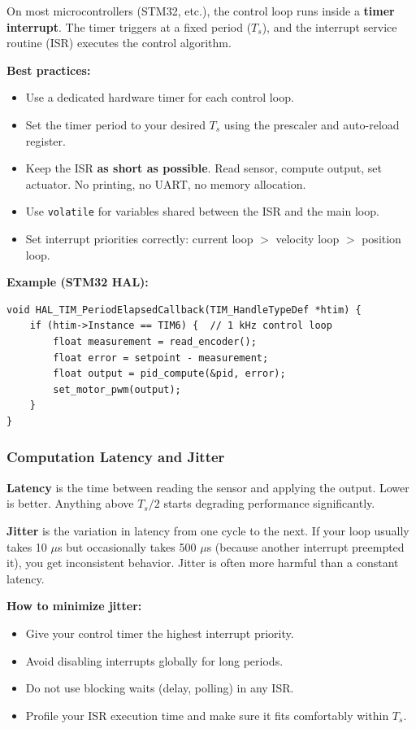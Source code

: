 On most microcontrollers (STM32, etc.), the control loop runs inside a \textbf{timer interrupt}. The timer triggers at a fixed period ($T_s$), and the interrupt service routine (ISR) executes the control algorithm.

\textbf{Best practices:}
\begin{itemize}
    \item Use a dedicated hardware timer for each control loop.
    \item Set the timer period to your desired $T_s$ using the prescaler and auto-reload register.
    \item Keep the ISR \textbf{as short as possible}. Read sensor, compute output, set actuator. No printing, no UART, no memory allocation.
    \item Use \texttt{volatile} for variables shared between the ISR and the main loop.
    \item Set interrupt priorities correctly: current loop $>$ velocity loop $>$ position loop.
\end{itemize}

\textbf{Example (STM32 HAL):}
\begin{verbatim}
void HAL_TIM_PeriodElapsedCallback(TIM_HandleTypeDef *htim) {
    if (htim->Instance == TIM6) {  // 1 kHz control loop
        float measurement = read_encoder();
        float error = setpoint - measurement;
        float output = pid_compute(&pid, error);
        set_motor_pwm(output);
    }
}
\end{verbatim}

\subsubsection{Computation Latency and Jitter}

\textbf{Latency} is the time between reading the sensor and applying the output. Lower is better. Anything above $T_s / 2$ starts degrading performance significantly.

\textbf{Jitter} is the variation in latency from one cycle to the next. If your loop usually takes 10 $\mu$s but occasionally takes 500 $\mu$s (because another interrupt preempted it), you get inconsistent behavior. Jitter is often more harmful than a constant latency.

\textbf{How to minimize jitter:}
\begin{itemize}
    \item Give your control timer the highest interrupt priority.
    \item Avoid disabling interrupts globally for long periods.
    \item Do not use blocking waits (delay, polling) in any ISR.
    \item Profile your ISR execution time and make sure it fits comfortably within $T_s$.
\end{itemize}

